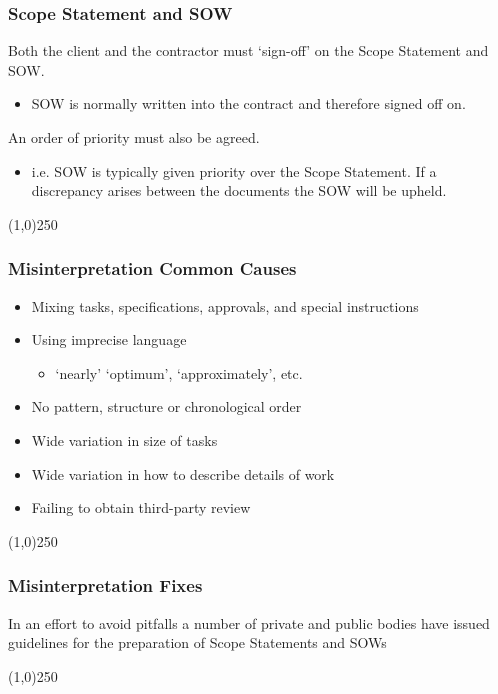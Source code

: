 \begin{frame}
\frametitle{Scope Statement and SOW}
Both the client and the contractor must `sign-off' on the Scope Statement and SOW.
\begin{itemize}
	\item SOW is normally written into the contract and therefore signed off on.
\end{itemize}
An order of priority must also be agreed.
\begin{itemize}
	\item i.e. SOW is typically given priority over the Scope Statement.  If a discrepancy arises between the documents the SOW will be upheld.
\end{itemize}
\end{frame}\begin{center}\line(1,0){250}\end{center}



\begin{frame}
\frametitle{Misinterpretation \hfill Common Causes}
\begin{itemize}
	\item Mixing tasks, specifications, approvals, and special instructions
	\item Using imprecise language
	\begin{itemize}
		\item `nearly' `optimum', `approximately', etc.
	\end{itemize}	
	\item No pattern, structure or chronological order
	\item Wide variation in size of tasks
	\item Wide variation in how to describe details of work
	\item Failing to obtain third-party review
\end{itemize}
\end{frame}\begin{center}\line(1,0){250}\end{center}



\begin{frame}
\frametitle{Misinterpretation \hfill Fixes}
In an effort to avoid pitfalls a number of private and public bodies have issued guidelines for the preparation of Scope Statements and SOWs\\
\end{frame}\begin{center}\line(1,0){250}\end{center}



